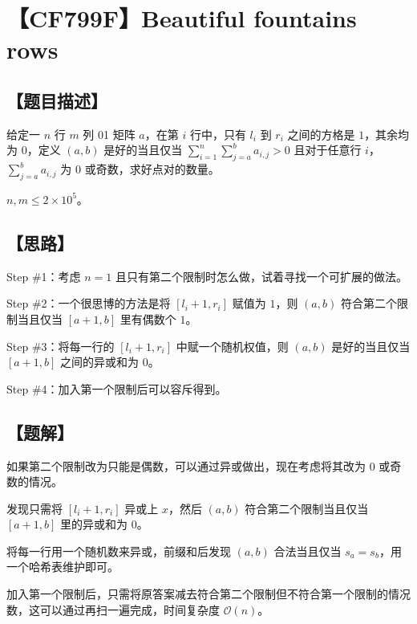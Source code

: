 \documentclass[UTF8,12pt,a4paper]{ctexart} %
\begin{document}
	\fontsize{12pt}{12pt}\selectfont
	
	\newpage
	\pagestyle{fancy}
	
	\section*{【CF799F】Beautiful fountains rows}
	
	\subsection*{【题目描述】}
	
	给定一 $n$ 行 $m$ 列 01 矩阵 $a$，在第 $i$ 行中，只有 $l_i$ 到 $r_i$ 之间的方格是 $1$，其余均为 $0$，定义 $(a,b)$ 是好的当且仅当 $\sum\limits_{i=1}^{n}\sum\limits_{j=a}^{b}a_{i,j}>0$ 且对于任意行 $i$，$\sum\limits_{j=a}^{b}a_{i,j}$ 为 $0$ 或奇数，求好点对的数量。
	
	$n,m\le2\times10^5$。
	
	\subsection*{【思路】}
	
	Step \#1：考虑 $n=1$ 且只有第二个限制时怎么做，试着寻找一个可扩展的做法。
	
	Step \#2：一个很思博的方法是将 $[l_i+1,r_i]$ 赋值为 $1$，则 $(a,b)$ 符合第二个限制当且仅当 $[a+1,b]$ 里有偶数个 $1$。
	
	Step \#3：将每一行的 $[l_i+1,r_i]$ 中赋一个随机权值，则 $(a,b)$ 是好的当且仅当 $[a+1,b]$ 之间的异或和为 $0$。
	
	Step \#4：加入第一个限制后可以容斥得到。
	
	\subsection*{【题解】}
	
	如果第二个限制改为只能是偶数，可以通过异或做出，现在考虑将其改为 $0$ 或奇数的情况。
	
	发现只需将 $[l_i+1,r_i]$ 异或上 $x$，然后 $(a,b)$ 符合第二个限制当且仅当 $[a+1,b]$ 里的异或和为 $0$。
	
	将每一行用一个随机数来异或，前缀和后发现 $(a,b)$ 合法当且仅当 $s_a=s_b$，用一个哈希表维护即可。
	
	加入第一个限制后，只需将原答案减去符合第二个限制但不符合第一个限制的情况数，这可以通过再扫一遍完成，时间复杂度 $\mathcal{O}(n)$。
	
\end{document}
